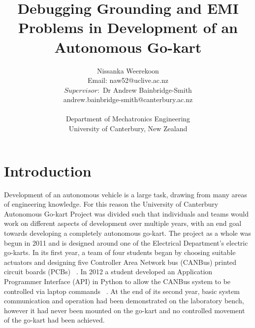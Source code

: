 \documentclass{ENZCon}
\begin{document}
\title{Debugging Grounding and EMI Problems in Development of an Autonomous Go-kart}

\author{Nissanka Weerekoon\\
Email: naw52@uclive.ac.nz \\
$Supervisor:$ Dr Andrew Bainbridge-Smith\\
andrew.bainbridge-smith@canterbury.ac.nz\\
\\
Department of Mechatronics Engineering\\
University of Canterbury, New Zealand}



\maketitle

\section{Introduction}

Development of an autonomous vehicle is a large task, drawing from many areas of engineering knowledge. For this reason the University of Canterbury Autonomous Go-kart Project was divided such that individuals and teams would work on different aspects of development over multiple years, with an end goal towards developing a completely autonomous go-kart. The project as a whole was begun in 2011 and is designed around one of the Electrical Department's electric go-karts. In its first year, a team of four students began by choosing suitable actuators and designing five Controller Area Network bus (CANBus) printed circuit boards (PCBs)~\cite{Jenkins_2011, Looman_2011, Richards_2011, taylor_2011} . In 2012 a student developed an Application Programmer Interface (API) in Python to allow the CANBus system to be controlled via laptop commands ~\cite{Wigley_2012}. At the end of its second year, basic system communication and operation had been demonstrated on the laboratory bench, however it had never been mounted on the go-kart and no controlled movement of the go-kart had been achieved.
\end{document}
